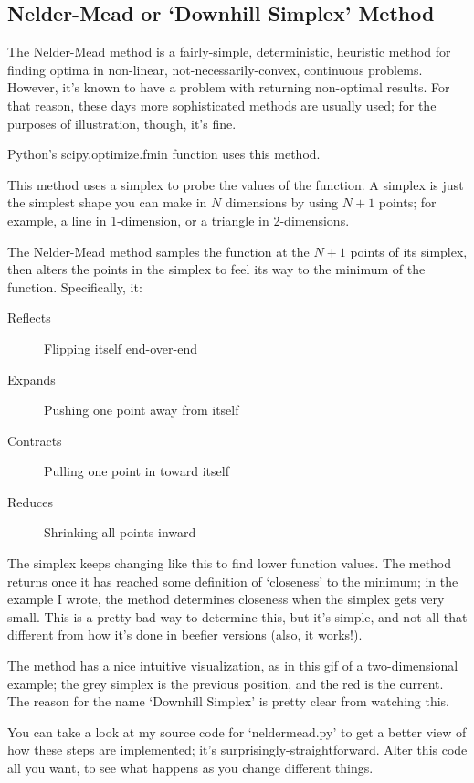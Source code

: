 \documentclass{article}
\begin{document}
	\subsection*{Nelder-Mead or `Downhill Simplex' Method}
		The Nelder-Mead method is a fairly-simple, deterministic, heuristic method
		for finding optima in non-linear, not-necessarily-convex, continuous problems.
		However, it's known to have
		a problem with returning non-optimal results. For that reason,
		these days more sophisticated methods are usually used; for
		the purposes of illustration, though, it's fine.

		Python's scipy.optimize.fmin function uses this method.

    This method uses a simplex to probe the values of the function.
    A simplex is just the simplest shape you can make in $N$
    dimensions by using $N+1$ points; for example, a line in
    1-dimension, or a triangle in 2-dimensions. 

    The Nelder-Mead method samples the function at the $N+1$ points
    of its simplex, then alters the points in the simplex to
    feel its way to the minimum of the function. Specifically, it:
    \begin{description}
      \item[Reflects] Flipping itself end-over-end
      \item[Expands] Pushing one point away from itself
      \item[Contracts] Pulling one point in toward itself
      \item[Reduces] Shrinking all points inward
    \end{description}

    The simplex keeps changing like this to find lower
    function values. The method returns once it has reached
    some definition of `closeness' to the minimum; in the example
    I wrote, the method determines closeness when the simplex
    gets very small. This is a pretty bad way to determine this,
    but it's simple, and not all that different from how it's
    done in beefier versions (also, it works!).

		The method has a nice intuitive visualization, as in 
		\href{http://userpages.umbc.edu/~rostamia/nelder-mead.html}{this gif}
		of a two-dimensional example; the grey simplex is the previous 
    position, and the red is the current. The reason for the name
		`Downhill Simplex' is pretty clear from watching this.

    You can take a look at my source code for `neldermead.py' to
    get a better view of how these steps are implemented; it's 
    surprisingly-straightforward. Alter this code all you 
    want, to see what happens as you change different things.
\end{document}
